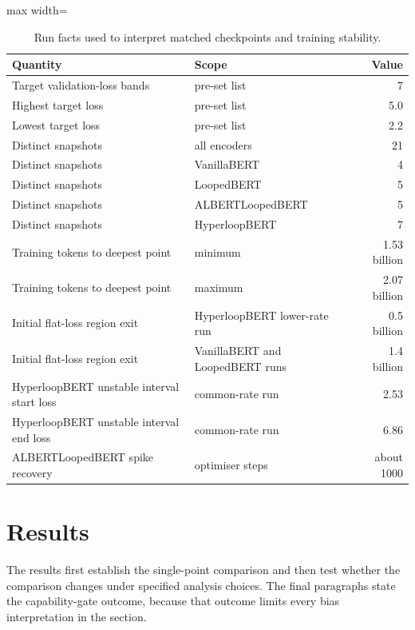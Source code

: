 \documentclass[sigconf,natbib=true,anonymous=true]{acmart}
\begin{document}
\begin{table}[t]
\centering
\caption{Run facts used to interpret matched checkpoints and training stability.}
\label{tab:runfacts}
\footnotesize
\begin{adjustbox}{max width=\columnwidth}
\begin{tabular}{llr}
\toprule
Quantity & Scope & Value \\
\midrule
Target validation-loss bands & pre-set list & 7 \\
Highest target loss & pre-set list & 5.0 \\
Lowest target loss & pre-set list & 2.2 \\
Distinct snapshots & all encoders & 21 \\
Distinct snapshots & VanillaBERT & 4 \\
Distinct snapshots & LoopedBERT & 5 \\
Distinct snapshots & ALBERTLoopedBERT & 5 \\
Distinct snapshots & HyperloopBERT & 7 \\
Training tokens to deepest point & minimum & 1.53 billion \\
Training tokens to deepest point & maximum & 2.07 billion \\
Initial flat-loss region exit & HyperloopBERT lower-rate run & 0.5 billion \\
Initial flat-loss region exit & VanillaBERT and LoopedBERT runs & 1.4 billion \\
HyperloopBERT unstable interval start loss & common-rate run & 2.53 \\
HyperloopBERT unstable interval end loss & common-rate run & 6.86 \\
ALBERTLoopedBERT spike recovery & optimiser steps & about 1000 \\
\bottomrule
\end{tabular}
\end{adjustbox}
\end{table}

\section{Results}
\label{sec:results}

The results first establish the single-point comparison and then test whether
the comparison changes under specified analysis choices. The final paragraphs
state the capability-gate outcome, because that outcome limits every bias
interpretation in the section.
\end{document}
